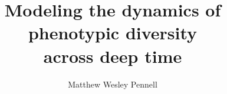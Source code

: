 \documentclass[
12pt
,oneside
,openleft         %
]{mythesis}
\title{Modeling the dynamics of \\
phenotypic diversity\\%
  across deep time}
\author{Matthew Wesley Pennell}
\begin{document}
\maketitle



%
\allcontents


\cleardoublepage
\mainbody







%

\formatbibliography



\formatappendices


\end{document}
